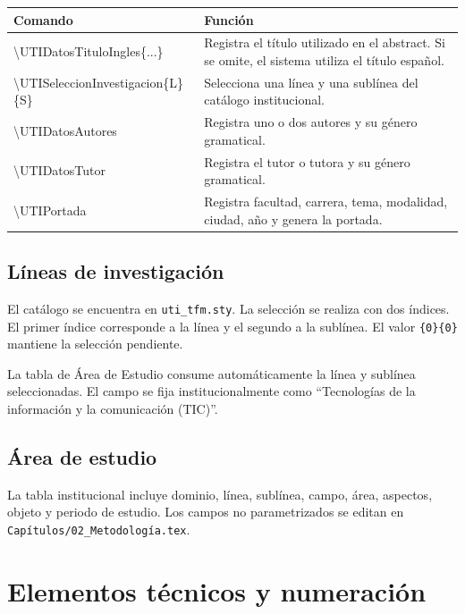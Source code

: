 \documentclass[12pt,a4paper,oneside]{report}
\begin{document}
\begin{longtable}{|p{5.2cm}|p{7.4cm}|}
  \hline
  \textbf{Comando} & \textbf{Función} \\
  \hline
  {\scriptsize\ttfamily\textbackslash UTIDatosTituloIngles\{...\}} & Registra el título utilizado en el abstract. Si se omite, el sistema utiliza el título español. \\
  \hline
  {\scriptsize\ttfamily\textbackslash UTISeleccionInvestigacion\{L\}\{S\}} & Selecciona una línea y una sublínea del catálogo institucional. \\
  \hline
  {\scriptsize\ttfamily\textbackslash UTIDatosAutores} & Registra uno o dos autores y su género gramatical. \\
  \hline
  {\scriptsize\ttfamily\textbackslash UTIDatosTutor} & Registra el tutor o tutora y su género gramatical. \\
  \hline
  {\scriptsize\ttfamily\textbackslash UTIPortada} & Registra facultad, carrera, tema, modalidad, ciudad, año y genera la portada. \\
  \hline
\end{longtable}

\section{Líneas de investigación}

El catálogo se encuentra en \texttt{uti\_tfm.sty}. La selección se realiza con dos índices. El primer índice corresponde a la línea y el segundo a la sublínea. El valor \texttt{\{0\}\{0\}} mantiene la selección pendiente.

La tabla de Área de Estudio consume automáticamente la línea y sublínea seleccionadas. El campo se fija institucionalmente como ``Tecnologías de la información y la comunicación (TIC)''.

\section{Área de estudio}

La tabla institucional incluye dominio, línea, sublínea, campo, área, aspectos, objeto y periodo de estudio. Los campos no parametrizados se editan en \texttt{Capítulos/02\_Metodología.tex}.

\chapter{Elementos técnicos y numeración}
\end{document}
